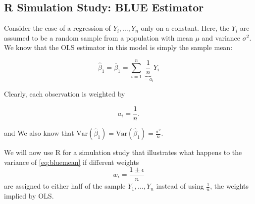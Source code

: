 \documentclass[]{book}
\theoremstyle{definition}
\theoremstyle{definition}
\theoremstyle{definition}
\theoremstyle{remark}
\begin{document}
\subsection*{R Simulation Study: BLUE
Estimator}\label{r-simulation-study-blue-estimator}

Consider the case of a regression of \(Y_i,\dots,Y_n\) only on a
constant. Here, the \(Y_i\) are assumed to be a random sample from a
population with mean \(\mu\) and variance \(\sigma^2\). We know that the
OLS estimator in this model is simply the sample mean:

\begin{equation}
\hat{\beta}_1 = \overline{\beta}_1 = \sum_{i=1}^n \underbrace{\frac{1}{n}}_{=a_i} Y_i \label{eq:bluemean}
\end{equation}

Clearly, each observation is weighted by

\[a_i = \frac{1}{n}.\]

and We also know that
\(\text{Var}(\hat{\beta}_1)=\text{Var}(\hat\beta_1)=\frac{\sigma^2}{n}\).

We will now use R for a simulation study that illustrates what happens
to the variance of \eqref{eq:bluemean} if different weights
\[ w_i = \frac{1 \pm \epsilon}{n} \] are assigned to either half of the
sample \(Y_1, \dots, Y_n\) instead of using \(\frac{1}{n}\), the weights
implied by OLS.
\end{document}
